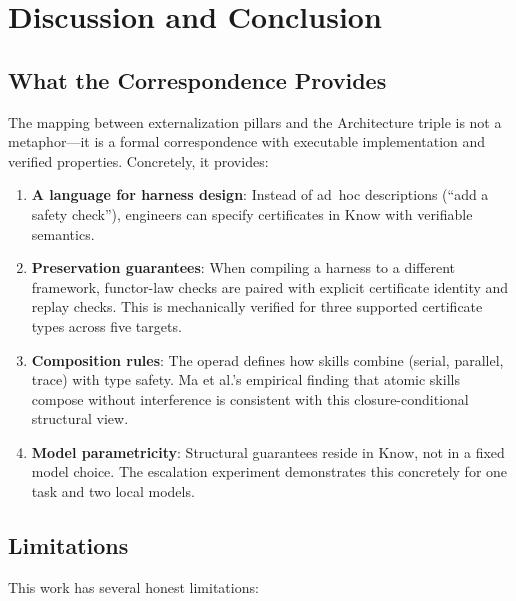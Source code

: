 \section{Discussion and Conclusion}\label{sec:conclusion}

\subsection{What the Correspondence Provides}

The mapping between externalization pillars and the Architecture triple is not a metaphor---it is a formal correspondence with executable implementation and verified properties. Concretely, it provides:

\begin{enumerate}[leftmargin=*]
\item \textbf{A language for harness design}: Instead of ad~hoc descriptions (``add a safety check''), engineers can specify certificates in $\mathrm{Know}$ with verifiable semantics.
\item \textbf{Preservation guarantees}: When compiling a harness to a different framework, functor-law checks are paired with explicit certificate identity and replay checks. This is mechanically verified for three supported certificate types across five targets.
\item \textbf{Composition rules}: The operad defines how skills combine (serial, parallel, trace) with type safety. Ma et al.'s empirical finding that atomic skills compose without interference is consistent with this closure-conditional structural view.
\item \textbf{Model parametricity}: Structural guarantees reside in $\mathrm{Know}$, not in a fixed model choice. The escalation experiment demonstrates this concretely for one task and two local models.
\end{enumerate}

\subsection{Limitations}

This work has several honest limitations:

